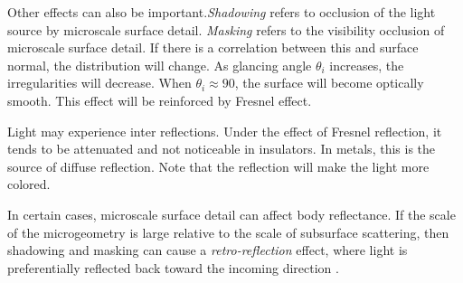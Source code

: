 \documentclass[10pt, a4paper]{article}
\begin{document}
            Other effects can also be important.\emph{Shadowing} refers to occlusion of the light source by microscale surface detail. \emph{Masking} refers to the visibility occlusion of microscale surface detail. If there is a correlation between this and surface normal, the distribution will change. As glancing angle $\theta_i$ increases, the irregularities will decrease. When $\theta_i \approx 90$, the surface will become optically smooth. This effect will be reinforced by Fresnel effect. 

            Light may experience inter reflections. Under the effect of Fresnel reflection, it tends to be attenuated and not noticeable in insulators. In metals, this is the source of diffuse reflection. Note that the reflection will make the light more colored. 

            In certain cases, microscale surface detail can affect body reflectance. If the scale of the microgeometry is large relative to the scale of subsurface scattering, then shadowing and masking can cause a \emph{retro-reflection} effect, where light is preferentially reflected back toward the incoming direction . 
 
            
\end{document}
